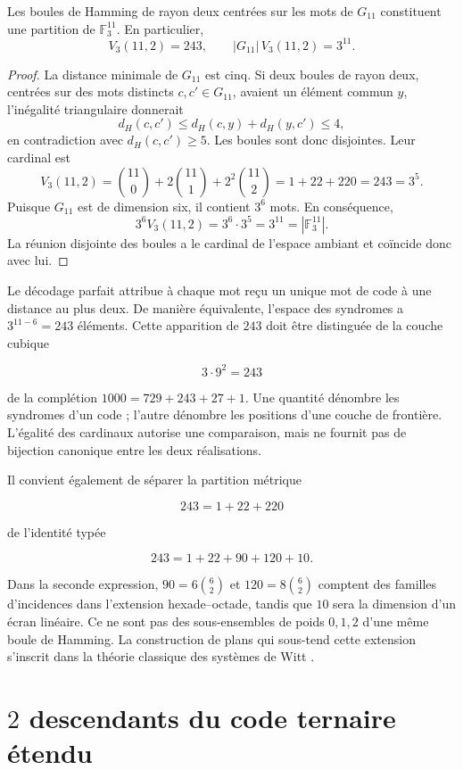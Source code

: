 \begin{theorem}[Perfection de \(G_{11}\)]
\label{thm:g11-perfecto}
Les boules de Hamming de rayon deux centrées sur les mots de \(G_{11}\)
constituent une partition de \(\mathbb F_3^{11}\). En particulier,
\[
V_3(11,2)=243,
\qquad
|G_{11}|\,V_3(11,2)=3^{11}.
\]
\end{theorem}

\begin{proof}
La distance minimale de \(G_{11}\) est cinq. Si deux boules de rayon deux,
centrées sur des mots distincts \(c,c'\in G_{11}\), avaient un élément
commun \(y\), l'inégalité triangulaire donnerait
\[
d_H(c,c')\leq d_H(c,y)+d_H(y,c')\leq4,
\]
en contradiction avec \(d_H(c,c')\geq5\). Les boules sont donc
disjointes. Leur cardinal est
\[
V_3(11,2)
=\binom{11}{0}+2\binom{11}{1}+2^2\binom{11}{2}
=1+22+220=243=3^5.
\]
Puisque \(G_{11}\) est de dimension six, il contient \(3^6\) mots. En
conséquence,
\[
3^6V_3(11,2)=3^6\cdot3^5=3^{11}
=|\mathbb F_3^{11}|.
\]
La réunion disjointe des boules a le cardinal de l'espace ambiant et
coïncide donc avec lui.
\end{proof}

Le décodage parfait attribue à chaque mot reçu un unique mot
de code à une distance au plus deux. De manière équivalente, l'espace des
syndromes a \(3^{11-6}=243\) éléments. Cette apparition de \(243\) doit
être distinguée de la couche cubique

\[
3\cdot9^2=243
\]

de la complétion \(1000=729+243+27+1\). Une quantité dénombre les syndromes
d'un code ; l'autre dénombre les positions d'une couche de frontière. L'égalité
des cardinaux autorise une comparaison, mais ne fournit pas de bijection
canonique entre les deux réalisations.

Il convient également de séparer la partition métrique

\[
243=1+22+220
\]

de l'identité typée

\[
243=1+22+90+120+10.
\]

Dans la seconde expression, \(90=6\binom62\) et
\(120=8\binom62\) comptent des familles d'incidences dans l'extension
hexade--octade, tandis que \(10\) sera la dimension d'un écran linéaire.
Ce ne sont pas des sous-ensembles de poids \(0,1,2\) d'une même boule de Hamming.
La construction de plans qui sous-tend cette extension s'inscrit dans la
théorie classique des systèmes de Witt \cite{AssmusKey1992}.

\section{\(2\) descendants du code ternaire étendu}
\label{sec:dos-descendientes-cw}

